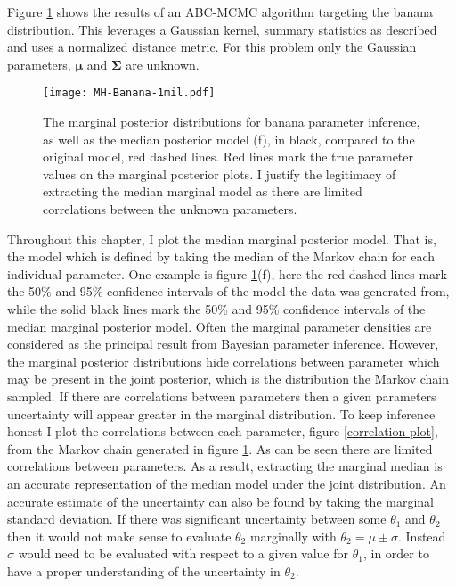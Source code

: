 Figure \ref{MH-banana} shows the results of an ABC-MCMC algorithm targeting the banana distribution. This leverages a Gaussian kernel, summary statistics as described and uses a normalized distance metric. For this problem only the Gaussian parameters, $\bm{\mu}$ and $\bm{\Sigma}$ are unknown.\\

\begin{figure}[H]
	\centering
	\texttt{[image: MH-Banana-1mil.pdf]}
	\caption{The marginal posterior distributions for banana parameter inference, as well as the median posterior model (f), in black, compared to the original model, red dashed lines. Red lines mark the true parameter values on the marginal posterior plots. I justify the legitimacy of extracting the median marginal model as there are limited correlations between the unknown parameters.}
	\label{MH-banana}
\end{figure}

Throughout this chapter, I plot the median marginal posterior model. That is, the model which is defined by taking the median of the Markov chain for each individual parameter. One example is figure \ref{MH-banana}(f), here the red dashed lines mark the 50\% and 95\% confidence intervals of the model the data was generated from, while the solid black lines mark the 50\% and 95\% confidence intervals of the median marginal posterior model. Often the marginal parameter densities are considered as the principal result from Bayesian parameter inference. However, the marginal posterior distributions hide correlations between parameter which may be present in the joint posterior, which is the distribution the Markov chain sampled. If there are correlations between parameters then a given parameters uncertainty will appear greater in the marginal distribution. To keep inference honest I plot the correlations between each parameter, figure \ref{correlation-plot}, from the Markov chain generated in figure \ref{MH-banana}. As can be seen there are limited correlations between parameters. As a result, extracting the marginal median is an accurate representation of the median model under the joint distribution. An accurate estimate of the uncertainty can also be found by taking the marginal standard deviation. If there was significant uncertainty between some $\theta_1$ and $\theta_2$ then it would not make sense to evaluate $\theta_2$ marginally with $\theta_2 = \mu \pm \sigma$. Instead $\sigma$ would need to be evaluated with respect to a given value for $\theta_1$, in order to have a proper understanding of the uncertainty in $\theta_2$. 

